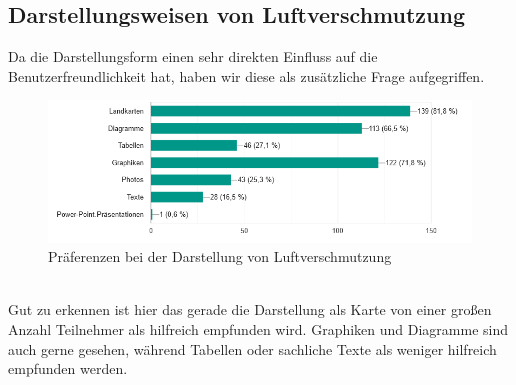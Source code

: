 \subsection{Darstellungsweisen von Luftverschmutzung}
Da die Darstellungsform einen sehr direkten Einfluss auf die Benutzerfreundlichkeit hat, haben wir diese als zusätzliche Frage aufgegriffen.
\\
\begin{figure}[h]
    \centering
    \includegraphics[width=1\textwidth]{media/diagram/darstellung.png}
    \caption{Präferenzen bei der Darstellung von Luftverschmutzung}
\end{figure}
\\
Gut zu erkennen ist hier das gerade die Darstellung als Karte von einer großen Anzahl Teilnehmer als hilfreich empfunden wird.
Graphiken und Diagramme sind auch gerne gesehen, während Tabellen oder sachliche Texte als weniger hilfreich empfunden werden.